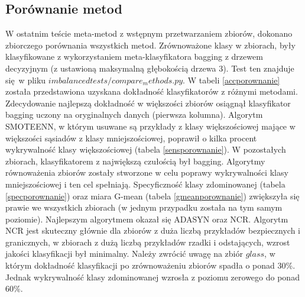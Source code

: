 \subsection{Porównanie metod}
W ostatnim teście meta-metod z wstępnym przetwarzaniem zbiorów, dokonano zbiorczego porównania wszystkich metod. Zrównoważone klasy w zbiorach, były klasyfikowane z wykorzystaniem meta-klasyfikatora bagging z drzewem decyzyjnym (z ustawioną maksymalną głębokością drzewa 3). Test ten znajduje się w pliku $imbalancedtests/compare_methods.py$. W tabeli \ref{accporownanie} została przedstawiona uzyskana dokładność klasyfikatorów z różnymi metodami. Zdecydowanie najlepszą dokładność w większości zbiorów osiągnął klasyfikator bagging uczony na oryginalnych danych (pierwsza kolumna). Algorytm SMOTEENN, w którym usuwane są przykłady z klasy większościowej mające w większości sąsiadów z klasy mniejszościowej, poprawił o kilka procent wykrywalność klasy większościowej (tabela \ref{sensporownanie}). W pozostałych zbiorach, klasyfikatorem z największą czułością był bagging. Algorytmy równoważenia zbiorów zostały stworzone w celu poprawy wykrywalności klasy mniejszościowej i ten cel spełniają. Specyficzność klasy zdominowanej (tabela \ref{specporownanie}) oraz miara G-mean (tabela \ref{gmeanporownanie}) zwiększyła się prawie we wszystkich zbiorach (w jednym przypadku została na tym samym poziomie). Najlepszym algorytmem okazał się ADASYN oraz NCR. Algorytm NCR jest skuteczny głównie dla zbiorów z duża liczbą przykładów bezpiecznych i granicznych, w zbiorach z dużą liczbą przykładów rzadki i odstających, wzrost jakości klasyfikacji był minimalny. Należy zwrócić uwagę na zbiór $glass$, w którym dokładność klasyfikacji po zrównoważeniu zbiorów spadła o ponad 30\%. Jednak wykrywalność klasy zdominowanej wzrosła z poziomu zerowego do ponad 60\%. 

